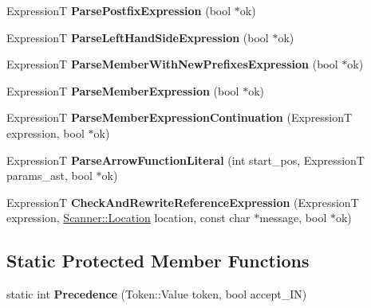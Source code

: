 \begin{DoxyCompactItemize}
\item 
\hypertarget{classv8_1_1internal_1_1_parser_base_a27f3588ac2fa91f2b1294e1e8c4967bf}{}Expression\+T {\bfseries Parse\+Postfix\+Expression} (bool $\ast$ok)\label{classv8_1_1internal_1_1_parser_base_a27f3588ac2fa91f2b1294e1e8c4967bf}

\item 
\hypertarget{classv8_1_1internal_1_1_parser_base_afce2d0d50b1c2a0d6087b7134fe69e46}{}Expression\+T {\bfseries Parse\+Left\+Hand\+Side\+Expression} (bool $\ast$ok)\label{classv8_1_1internal_1_1_parser_base_afce2d0d50b1c2a0d6087b7134fe69e46}

\item 
\hypertarget{classv8_1_1internal_1_1_parser_base_acbec3a563e962bf70177bc590c0565fe}{}Expression\+T {\bfseries Parse\+Member\+With\+New\+Prefixes\+Expression} (bool $\ast$ok)\label{classv8_1_1internal_1_1_parser_base_acbec3a563e962bf70177bc590c0565fe}

\item 
\hypertarget{classv8_1_1internal_1_1_parser_base_af67cd0d7963766d93ab6aba4bf1f65b6}{}Expression\+T {\bfseries Parse\+Member\+Expression} (bool $\ast$ok)\label{classv8_1_1internal_1_1_parser_base_af67cd0d7963766d93ab6aba4bf1f65b6}

\item 
\hypertarget{classv8_1_1internal_1_1_parser_base_af4138e9f04dead10f8e938408c2e6e75}{}Expression\+T {\bfseries Parse\+Member\+Expression\+Continuation} (Expression\+T expression, bool $\ast$ok)\label{classv8_1_1internal_1_1_parser_base_af4138e9f04dead10f8e938408c2e6e75}

\item 
\hypertarget{classv8_1_1internal_1_1_parser_base_a3aaeafcd63f541bd63918df506a24e05}{}Expression\+T {\bfseries Parse\+Arrow\+Function\+Literal} (int start\+\_\+pos, Expression\+T params\+\_\+ast, bool $\ast$ok)\label{classv8_1_1internal_1_1_parser_base_a3aaeafcd63f541bd63918df506a24e05}

\item 
\hypertarget{classv8_1_1internal_1_1_parser_base_ab12a81cfc96cd77c26ac93039c224ec9}{}Expression\+T {\bfseries Check\+And\+Rewrite\+Reference\+Expression} (Expression\+T expression, \hyperlink{structv8_1_1internal_1_1_scanner_1_1_location}{Scanner\+::\+Location} location, const char $\ast$message, bool $\ast$ok)\label{classv8_1_1internal_1_1_parser_base_ab12a81cfc96cd77c26ac93039c224ec9}

\end{DoxyCompactItemize}
\subsection*{Static Protected Member Functions}
\begin{DoxyCompactItemize}
\item 
\hypertarget{classv8_1_1internal_1_1_parser_base_a1ef51a4dddedfda66da7d65ea33f82b2}{}static int {\bfseries Precedence} (Token\+::\+Value token, bool accept\+\_\+\+I\+N)\label{classv8_1_1internal_1_1_parser_base_a1ef51a4dddedfda66da7d65ea33f82b2}

\end{DoxyCompactItemize}

